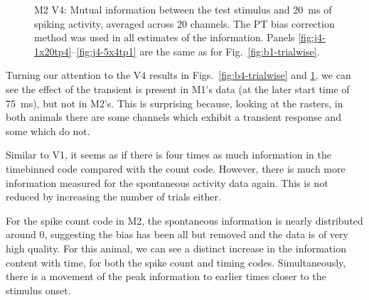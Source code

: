 \begin{figure}[htbp]
\begin{subfigure}[b]{0.5\linewidth}
    \end{subfigure}
    \caption{\ac{M2} \ac{V4}: Mutual information between the test stimulus and \SI{20}{ms} of spiking activity, averaged across 20 channels.
The \ac{PT} bias correction method was used in all estimates of the information.
Panels \ref{fig:j4-1x20tp4}--\ref{fig:j4-5x4tp1} are the same as for Fig.~\ref{fig:b1-trialwise}.
}
    \label{fig:j4-trialwise}
\end{figure}



Turning our attention to the \ac{V4} results in Figs.~\ref{fig:b4-trialwise} and \ref{fig:j4-trialwise}, we can see the effect of the transient is present in \ac{M1}'s data (at the later start time of \SI{75}{ms}), but not in \ac{M2}'s.
This is surprising because, looking at the rasters, in both animals there are some channels which exhibit a transient response and some which do not.

Similar to \ac{V1}, it seems as if there is four times as much information in the timebinned code compared with the count code.
However, there is much more information measured for the spontaneous activity data again.
This is not reduced by increasing the number of trials either.

For the spike count code in \ac{M2}, the spontaneous information is nearly distributed around 0, suggesting the bias has been all but removed and the data is of very high quality.
For this animal, we can see a distinct increase in the information content with time, for both the spike count and timing codes.
Simultaneously, there is a movement of the peak information to earlier times closer to the stimulus onset.

